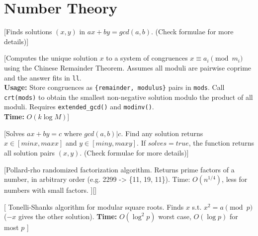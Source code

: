 \chapter{Number Theory}






[Finds solutions $(x, y)$ in $ax+by = gcd(a, b)$. (Check formulae for more details)]

[Computes the unique solution $x$ to a system of congruences $x \equiv a_i \pmod{m_i}$ using the Chinese Remainder Theorem. Assumes all moduli are pairwise coprime and the answer fits in \texttt{ll}. \\
\textbf{Usage:} Store congruences as \texttt{\{remainder, modulus\}} pairs in \texttt{mods}. Call \texttt{crt(mods)} to obtain the smallest non-negative solution modulo the product of all moduli. Requires \texttt{extended\_gcd()} and \texttt{modinv()}. \\
\textbf{Time:} {$O(k \log M)$}]

[Solves $ax+by = c$ where $gcd(a,b) | c$. Find any solution returns $x \in [minx, maxx]$ and $y \in [miny, maxy]$. If $solves=true$, 
the function returns all solution pairs $(x,y)$. (Check formulae for more details)]


[Pollard-rho randomized factorization algorithm. Returns prime
 factors of a number, in arbitrary order (e.g. 2299 -> \{11, 19, 11\}).
 Time: $O(n^{1/4})$, less for numbers with small factors.
][]

[
  Tonelli-Shanks algorithm for modular square roots. Finds $x$ s.t. $x^2 = a \pmod p$ ($-x$ gives the other solution).
  \textbf{Time:} $O(\log^2 p)$ worst case, $O(\log p)$ for most $p$
]

